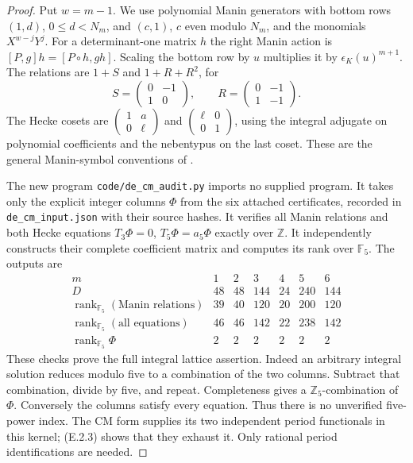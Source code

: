 \begin{proof}
Put \(w=m-1\). We use polynomial Manin generators with
bottom rows
\((1,d)\), \(0\le d<N_m\), and \((c,1)\), \(c\) even
modulo \(N_m\), and the monomials \(X^{w-j}Y^j\).
For a determinant-one matrix \(h\) the right Manin action
is \([P,g]h=[P\circ h,gh]\). Scaling the bottom row by
\(u\) multiplies it by \(\epsilon_K(u)^{m+1}\).
The relations are \(1+S\) and \(1+R+R^2\), for
\[
 S=\begin{pmatrix}0&-1\\1&0\end{pmatrix},\qquad
 R=\begin{pmatrix}0&-1\\1&-1\end{pmatrix}.
\]
The Hecke cosets are
\(\left(\begin{smallmatrix}1&a\\0&\ell\end{smallmatrix}\right)\)
and \(\left(\begin{smallmatrix}\ell&0\\0&1\end{smallmatrix}\right)\),
using the integral adjugate on polynomial coefficients and
the nebentypus on the last coset. These are the general
Manin-symbol conventions of \cite{DE_Stein2007}.

The new program \texttt{code/de\_cm\_audit.py} imports
no supplied program. It takes only the explicit integer
columns \(\Phi\) from the six attached certificates, recorded
in \texttt{de\_cm\_input.json} with their source hashes.
It verifies all Manin relations and both Hecke equations
\(T_3\Phi=0\), \(T_5\Phi=a_5\Phi\) exactly over
\(\mathbb Z\). It independently constructs their complete
coefficient matrix and computes its rank over \(\mathbb F_5\).
The outputs are
\[
\begin{array}{c|rrrrrr}
m&1&2&3&4&5&6\\\hline
D&48&48&144&24&240&144\\
\operatorname{rank}_{\mathbb F_5}(\text{Manin relations})
 &39&40&120&20&200&120\\
\operatorname{rank}_{\mathbb F_5}(\text{all equations})
 &46&46&142&22&238&142\\
\operatorname{rank}_{\mathbb F_5}\Phi&2&2&2&2&2&2
\end{array}                                                   \tag{E.2.3}
\]
These checks prove the full integral lattice assertion.
Indeed an arbitrary integral solution reduces modulo five
to a combination of the two columns. Subtract that
combination, divide by five, and repeat. Completeness gives
a \(\mathbb Z_5\)-combination of \(\Phi\). Conversely the
columns satisfy every equation. Thus there is no unverified
five-power index. The CM form supplies its two independent
period functionals in this kernel; (E.2.3) shows that they
exhaust it. Only rational period identifications are needed.


\end{proof}
